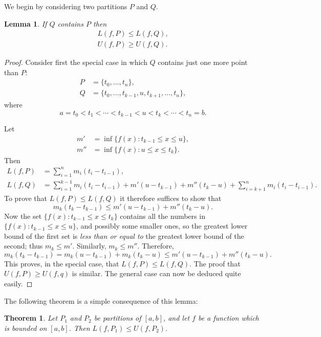 \documentclass{article}
\numberwithin{corollary}{subsection}
\numberwithin{definition}{subsection}
\newtheorem{lemma}{Lemma}
\numberwithin{lemma}{subsection}
\newtheorem{theorem}{Theorem}
\numberwithin{theorem}{subsection}
\begin{document}
We begin by considering two partitions $P$ and $Q$.

\begin{lemma}
  If $Q$ contains $P$ then
  \begin{align*}
    L(f, P) \leq L(f, Q), \\
    U(f, P) \geq U(f, Q).
  \end{align*}
\end{lemma}
\begin{proof}
  Consider first the special case in which $Q$ contains just one more point
  than $P$:
  \begin{align*}
    P &= \{t_0, \ldots, t_n\}, \\
    Q &= \{t_0, \ldots, t_{k - 1}, u, t_{k + 1}, \ldots, t_n\},
  \end{align*} where \[
    a = t_0 < t_1 < \cdots < t_{k - 1} < u < t_k < \cdots < t_n = b.
  \]

  Let
  \begin{align*}
    m'  &= \inf\{f(x): t_{k - 1} \leq x \leq u\}, \\
    m'' &= \inf\{f(x): u \leq x \leq t_k\}.
  \end{align*}
  Then
  \begin{align*}
    L(f, P) &= \sum_{i=1}^n m_i(t_i - t_{i-1}), \\
    L(f, Q) &= \sum_{i=1}^{k-1} m_i(t_i - t_{i-1}) + m'(u - t_{k-1}) +
    m''(t_k - u) + \sum_{i=k+1}^n m_i(t_i - t_{i-1}).
  \end{align*} To prove that $L(f, P) \leq L(f, Q)$ it therefore suffices to
  show that \[
    m_k(t_k - t_{k-1}) \leq m'(u - t_{k-1}) + m''(t_k - u).
  \] Now the set $\{f(x): t_{k-1} \leq x \leq t_k\}$ contains all the numbers
  in $\{f(x): t_{k-1} \leq x \leq u\}$, and possibly some smaller ones, so the
  greatest lower bound of the first set is \emph{less than or equal to} the
  greatest lower bound of the second; thus $m_k \leq m'$. Similarly, $m_k \leq
  m''$. Therefore, \[
    m_k(t_k - t_{k-1}) = m_k(u - t_{k-1}) + m_k(t_k - u) \leq m'(u - t_{k-1}) +
    m''(t_k - u).
  \] This proves, in the special case, that $L(f, P) \leq L(f, Q)$. The proof
  that $U(f, P) \geq U(f, q)$ is similar. The general case can now be deduced
  quite easily.
\end{proof}

The following theorem is a simple consequence of this lemma:

\begin{theorem}
  Let $P_1$ and $P_2$ be partitions of $[a, b]$, and let $f$ be a function
  which is bounded on $[a, b]$. Then $L(f, P_1) \leq U(f, P_2)$.
\end{theorem}
\end{document}
